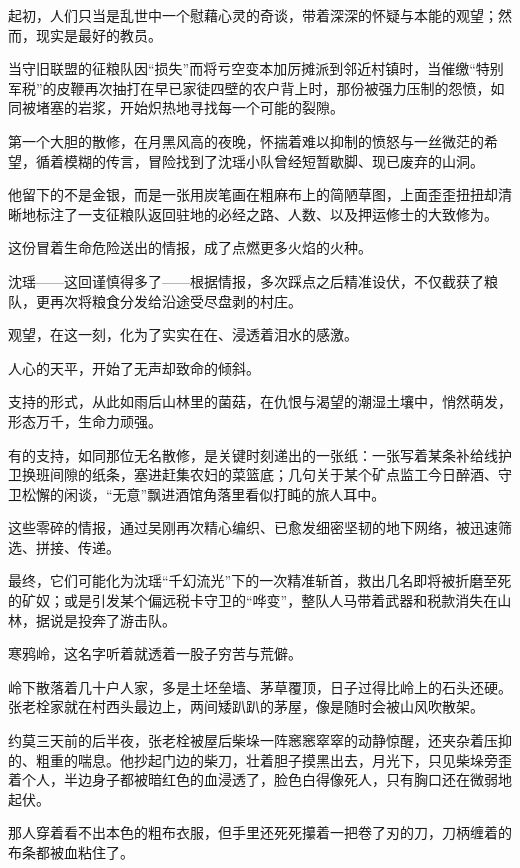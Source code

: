 起初，人们只当是乱世中一个慰藉心灵的奇谈，带着深深的怀疑与本能的观望；然而，现实是最好的教员。

当守旧联盟的征粮队因“损失”而将亏空变本加厉摊派到邻近村镇时，当催缴“特别军税”的皮鞭再次抽打在早已家徒四壁的农户背上时，那份被强力压制的怨愤，如同被堵塞的岩浆，开始炽热地寻找每一个可能的裂隙。

第一个大胆的散修，在月黑风高的夜晚，怀揣着难以抑制的愤怒与一丝微茫的希望，循着模糊的传言，冒险找到了沈瑶小队曾经短暂歇脚、现已废弃的山洞。

他留下的不是金银，而是一张用炭笔画在粗麻布上的简陋草图，上面歪歪扭扭却清晰地标注了一支征粮队返回驻地的必经之路、人数、以及押运修士的大致修为。

这份冒着生命危险送出的情报，成了点燃更多火焰的火种。

沈瑶——这回谨慎得多了——根据情报，多次踩点之后精准设伏，不仅截获了粮队，更再次将粮食分发给沿途受尽盘剥的村庄。

观望，在这一刻，化为了实实在在、浸透着泪水的感激。

人心的天平，开始了无声却致命的倾斜。

支持的形式，从此如雨后山林里的菌菇，在仇恨与渴望的潮湿土壤中，悄然萌发，形态万千，生命力顽强。

有的支持，如同那位无名散修，是关键时刻递出的一张纸：一张写着某条补给线护卫换班间隙的纸条，塞进赶集农妇的菜篮底；几句关于某个矿点监工今日醉酒、守卫松懈的闲谈，“无意”飘进酒馆角落里看似打盹的旅人耳中。

这些零碎的情报，通过吴刚再次精心编织、已愈发细密坚韧的地下网络，被迅速筛选、拼接、传递。

最终，它们可能化为沈瑶“千幻流光”下的一次精准斩首，救出几名即将被折磨至死的矿奴；或是引发某个偏远税卡守卫的“哗变”，整队人马带着武器和税款消失在山林，据说是投奔了游击队。

\vspace{2em}

寒鸦岭，这名字听着就透着一股子穷苦与荒僻。

岭下散落着几十户人家，多是土坯垒墙、茅草覆顶，日子过得比岭上的石头还硬。张老栓家就在村西头最边上，两间矮趴趴的茅屋，像是随时会被山风吹散架。

约莫三天前的后半夜，张老栓被屋后柴垛一阵窸窸窣窣的动静惊醒，还夹杂着压抑的、粗重的喘息。他抄起门边的柴刀，壮着胆子摸黑出去，月光下，只见柴垛旁歪着个人，半边身子都被暗红色的血浸透了，脸色白得像死人，只有胸口还在微弱地起伏。

那人穿着看不出本色的粗布衣服，但手里还死死攥着一把卷了刃的刀，刀柄缠着的布条都被血粘住了。

